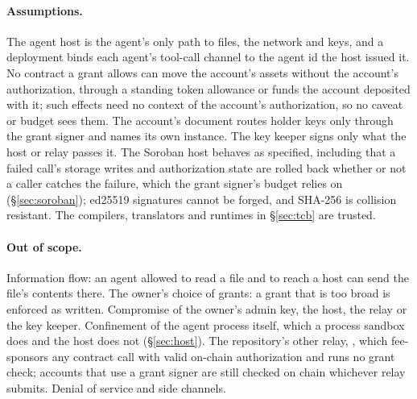\paragraph{Assumptions.} The agent host is the agent's only path to files,
the network and keys, and a deployment binds each agent's
tool-call channel to the agent id the host issued it. No
contract a grant allows can move the account's assets without the account's
authorization, through a standing token allowance or funds the account
deposited with it; such effects need no context
of the account's authorization, so no caveat or budget sees them. The account's
document routes holder keys only through the grant signer and names its own
instance. The key keeper signs only what the host
or relay passes it. The Soroban host behaves as
specified, including that a failed call's storage writes and authorization
state are rolled back whether or not a caller catches the failure, which the
grant signer's budget relies on (\S\ref{sec:soroban}); ed25519 signatures cannot be forged, and SHA-256 is collision
resistant. The compilers, translators and runtimes in \S\ref{sec:tcb} are
trusted.

\paragraph{Out of scope.} Information flow: an agent allowed to read a file
and to reach a host can send the file's contents there. The owner's choice of
grants: a grant that is too broad is enforced as written. Compromise of the
owner's admin key, the host, the relay or the key keeper. Confinement of the
agent process itself, which a process sandbox does and the host does not
(\S\ref{sec:host}). The repository's other relay, , which
fee-sponsors any contract call with valid on-chain authorization and runs no
grant check; accounts that use a grant signer are still checked on chain
whichever relay submits. Denial of service and side channels.
